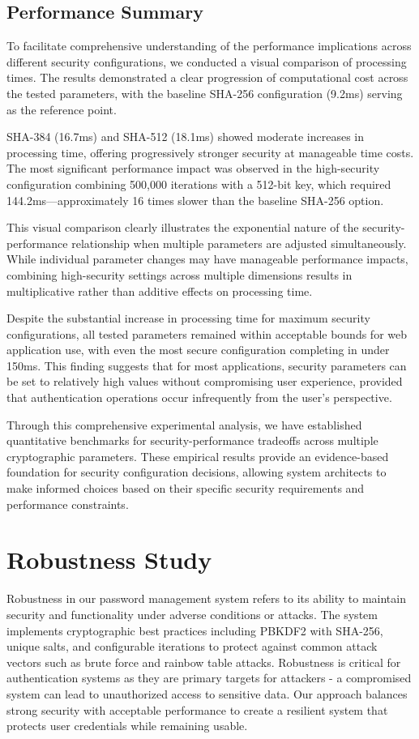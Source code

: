 \documentclass[11pt,a4paper]{article}
\begin{document}
\subsection{Performance Summary}
To facilitate comprehensive understanding of the performance implications across different security configurations, we conducted a visual comparison of processing times. The results demonstrated a clear progression of computational cost across the tested parameters, with the baseline SHA-256 configuration (9.2ms) serving as the reference point.

SHA-384 (16.7ms) and SHA-512 (18.1ms) showed moderate increases in processing time, offering progressively stronger security at manageable time costs. The most significant performance impact was observed in the high-security configuration combining 500,000 iterations with a 512-bit key, which required 144.2ms—approximately 16 times slower than the baseline SHA-256 option.

This visual comparison clearly illustrates the exponential nature of the security-performance relationship when multiple parameters are adjusted simultaneously. While individual parameter changes may have manageable performance impacts, combining high-security settings across multiple dimensions results in multiplicative rather than additive effects on processing time.

Despite the substantial increase in processing time for maximum security configurations, all tested parameters remained within acceptable bounds for web application use, with even the most secure configuration completing in under 150ms. This finding suggests that for most applications, security parameters can be set to relatively high values without compromising user experience, provided that authentication operations occur infrequently from the user's perspective.

Through this comprehensive experimental analysis, we have established quantitative benchmarks for security-performance tradeoffs across multiple cryptographic parameters. These empirical results provide an evidence-based foundation for security configuration decisions, allowing system architects to make informed choices based on their specific security requirements and performance constraints.

\section{Robustness Study}

Robustness in our password management system refers to its ability to maintain security and functionality under adverse conditions or attacks. The system implements cryptographic best practices including PBKDF2 with SHA-256, unique salts, and configurable iterations to protect against common attack vectors such as brute force and rainbow table attacks. Robustness is critical for authentication systems as they are primary targets for attackers - a compromised system can lead to unauthorized access to sensitive data. Our approach balances strong security with acceptable performance to create a resilient system that protects user credentials while remaining usable.
\end{document}
